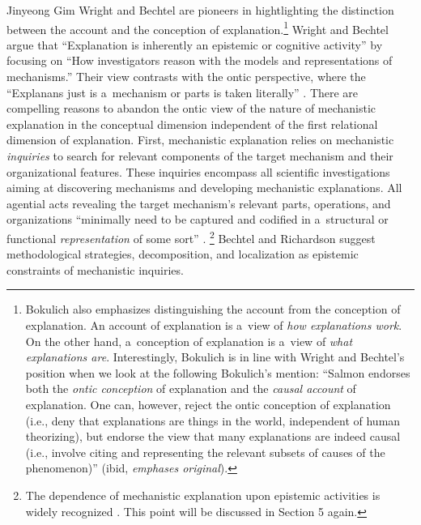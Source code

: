 \begin{artengenv}{Jinyeong Gim}
Wright and Bechtel are pioneers in hightlighting the distinction between the account and the conception of explanation.\footnote{Bokulich
\parencite*[][p.263]{bokulich_fiction_2016} %
 also emphasizes distinguishing the account from the conception of explanation. An account of explanation is a~view of \textit{how explanations work}. On the other hand, a~conception of explanation is a~view of \textit{what explanations are}. Interestingly, Bokulich is in line with Wright and Bechtel's position when we look at the following Bokulich's mention: ``Salmon endorses both the \textit{ontic conception} of explanation and the \textit{causal account} of explanation. One can, however, reject the ontic conception of explanation (i.e., deny that explanations are things in the world, independent of human theorizing), but endorse the view that many explanations are indeed causal (i.e., involve citing and representing the relevant subsets of causes of the phenomenon)'' (ibid, \textit{emphases original}).} Wright and Bechtel 
\parencite*[][p.73]{wright_mechanisms_2007} %
 argue that ``Explanation is inherently an epistemic or cognitive activity'' by focusing on ``How investigators reason with the models and representations of mechanisms.'' Their view contrasts with the ontic perspective, where the ``Explanans just is a~mechanism or parts is taken literally'' 
\parencite[][p.49]{wright_mechanisms_2007}. %
 There are compelling reasons to abandon the ontic view of the nature of mechanistic explanation in the conceptual dimension independent of the first relational dimension of explanation. First, mechanistic explanation relies on mechanistic \textit{inquiries} to search for relevant components of the target mechanism and their organizational features. These inquiries encompass all scientific investigations aiming at discovering mechanisms and developing mechanistic explanations. All agential acts revealing the target mechanism's relevant parts, operations, and organizations ``minimally need to be captured and codified in a~structural or functional \textit{representation} of some sort'' 
\parencite[][p.51]{wright_mechanisms_2007}.%
\footnote{The dependence of mechanistic explanation upon epistemic activities is widely recognized 
\parencite[see][p.1637]{kastner_discovering_2021}. %
 This point will be discussed in Section 5 again.} Bechtel and Richardson 
\parencite*[][]{bechtel_discovering_2010} %
 suggest methodological strategies, decomposition, and localization as epistemic constraints of mechanistic inquiries.


\end{artengenv}
